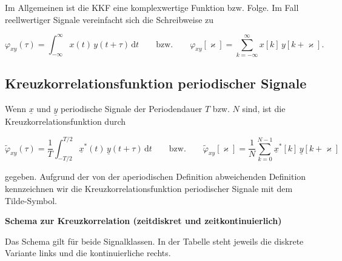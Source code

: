 Im Allgemeinen ist die KKF eine komplexwertige Funktion bzw. Folge. Im Fall reellwertiger Signale vereinfacht sich die Schreibweise zu

$$
\varphi_{xy}(\tau) = \int_{-\infty}^{\infty} x(t)\,y(t+\tau)\,\mathrm{d}t
\qquad \text{bzw.} \qquad
\varphi_{xy}[\varkappa] = \sum_{k=-\infty}^{\infty} x[k]\,y[k+\varkappa].
$$

\subsection*{Kreuzkorrelationsfunktion periodischer Signale}

Wenn $\underline{x}$ und $\underline{y}$ periodische Signale der Periodendauer $T$ bzw. $N$ sind, ist die Kreuzkorrelationsfunktion durch

$$
\tilde{\varphi}_{xy}(\tau) = \frac{1}{T}\int_{-T/2}^{T/2} \underline{x}^*(t)\,\underline{y}(t+\tau)\,\mathrm{d}t
\qquad \text{bzw.} \qquad
\tilde{\varphi}_{xy}[\varkappa] = \frac{1}{N}\sum_{k=0}^{N-1} \underline{x}^*[k]\,\underline{y}[k+\varkappa]
$$

gegeben. Aufgrund der von der aperiodischen Definition abweichenden Definition kennzeichnen wir die Kreuzkorrelationsfunktion periodischer Signale mit dem Tilde-Symbol.

\newpage
\textbf{Schema zur Kreuzkorrelation (zeitdiskret und zeitkontinuierlich)}

Das Schema gilt für beide Signalklassen. In der Tabelle steht jeweils die diskrete
Variante links und die kontinuierliche rechts.

